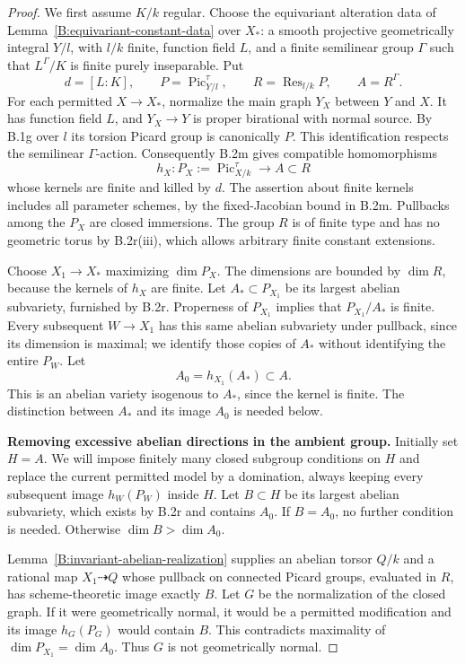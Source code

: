 \begin{proof}
We first assume $K/k$ regular.  Choose the equivariant alteration
data of Lemma~\ref{B:equivariant-constant-data} over $X_*$:
a smooth projective geometrically integral $Y/l$, with $l/k$
finite, function field $L$, and a finite semilinear group
$\Gamma$ such that $L^\Gamma/K$ is finite purely inseparable.
Put
\[
 d=[L:K],\qquad P=\operatorname{Pic}^{\tau}_{Y/l},\qquad
 R=\operatorname{Res}_{l/k}P,\qquad A=R^\Gamma.
\]
For each permitted $X\to X_*$, normalize the main graph
$Y_X$ between $Y$ and $X$.  It has function field $L$, and
$Y_X\to Y$ is proper birational with normal source.  By B.1g
over $l$ its torsion Picard group is canonically $P$.
This identification respects the semilinear $\Gamma$-action.
Consequently B.2m gives compatible homomorphisms
\[
 h_X:P_X:=\operatorname{Pic}^{\tau}_{X/k}\longrightarrow A
           \subset R
\]
whose kernels are finite and killed by $d$.  The assertion
about finite kernels includes all parameter schemes, by the
fixed-Jacobian bound in B.2m.  Pullbacks among the $P_X$ are
closed immersions.  The group $R$ is of finite type and has
no geometric torus by B.2r(iii), which allows arbitrary finite
constant extensions.

Choose $X_1\to X_*$ maximizing $\dim P_X$.
The dimensions are bounded by $\dim R$, because the kernels
of $h_X$ are finite.  Let $A_*\subset P_{X_1}$ be its largest
abelian subvariety, furnished by B.2r.  Properness of $P_{X_1}$
implies that $P_{X_1}/A_*$ is finite.  Every subsequent
$W\to X_1$ has this same abelian subvariety under pullback,
since its dimension is maximal; we identify those copies of
$A_*$ without identifying the entire $P_W$.
Let
\[
                         A_0=h_{X_1}(A_*)\subset A.
\]
This is an abelian variety isogenous to $A_*$, since the
kernel is finite.  The distinction between $A_*$ and its
image $A_0$ is needed below.

\par\smallskip\noindent\textbf{Removing excessive abelian directions in the ambient group.}\quad
Initially set $H=A$.  We will impose finitely many closed
subgroup conditions on $H$ and replace the current permitted
model by a domination, always keeping every subsequent image
$h_W(P_W)$ inside $H$.  Let $B\subset H$ be its largest
abelian subvariety, which exists by B.2r and contains $A_0$.
If $B=A_0$, no further condition is needed.
Otherwise $\dim B>\dim A_0$.

Lemma~\ref{B:invariant-abelian-realization} supplies an
abelian torsor $Q/k$ and a rational map $X_1\dashrightarrow Q$
whose pullback on connected Picard groups, evaluated in $R$,
has scheme-theoretic image exactly $B$.
Let $G$ be the normalization of the closed graph.
If it were geometrically normal, it would be a permitted
modification and its image $h_G(P_G)$ would contain $B$.
This contradicts maximality of $\dim P_{X_1}=\dim A_0$.
Thus $G$ is not geometrically normal.


\end{proof}

